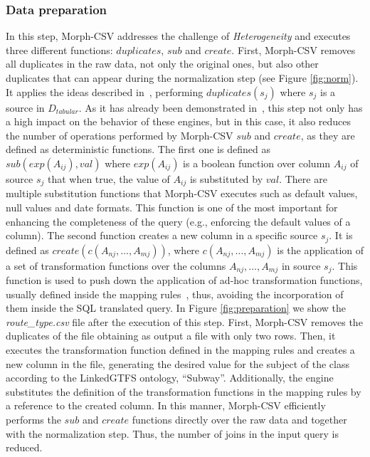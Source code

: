 \subsubsection*{Data preparation}
In this step, Morph-CSV addresses the challenge of \textit{Heterogeneity} and executes three different functions: $duplicates$, $sub$ and $create$. First, Morph-CSV removes all duplicates in the raw data, not only the original ones, but also other duplicates that can appear during the normalization step (see Figure \ref{fig:norm}). It applies the ideas described in~\citep{jozashoori2019mapsdi}, performing $duplicates(s_{j})$ where $s_{j}$ is a source in $D_{tabular}$. As it has already been demonstrated in~\citep{jozashoori2019mapsdi,iglesias2020sdm,jozashoori2020funmap}, this step not only has a high impact on the behavior of these engines, but in this case, it also reduces the number of operations performed by Morph-CSV $sub$ and $create$, as they are defined as deterministic functions. The first one is defined as $sub(exp(A_{ij}),val)$ where $exp(A_{ij})$ is a boolean function over column $A_{ij}$ of source $s_{j}$ that when true, the value of $A_{ij}$ is substituted by $val$. There are multiple substitution functions that Morph-CSV executes such as default values, null values and date formats. This function is one of the most important for enhancing the completeness of the query (e.g., enforcing the default values of a column). The second function creates a new column in a specific source $s_{j}$. It is defined as $create(c(A_{nj},\ldots,A_{mj}))$, where $c(A_{nj},\ldots,A_{mj})$ is the application of a set of transformation functions over the columns $A_{nj},\ldots,A_{mj}$ in source $s_{j}$. This function is used to push down the application of ad-hoc transformation functions, usually defined inside the mapping rules~\citep{junior2016funul,de2017declarative}, thus, avoiding the incorporation of them inside the SQL translated query. In Figure \ref{fig:preparation} we show the \textit{route\_type.csv} file after the execution of this step. First, Morph-CSV removes the duplicates of the file obtaining as output a file with only two rows. Then, it executes the transformation function defined in the mapping rules and creates a new column in the file, generating the desired value for the subject of the class according to the LinkedGTFS ontology, ``Subway''. Additionally, the engine substitutes the definition of the transformation functions in the mapping rules by a reference to the created column. In this manner, Morph-CSV efficiently performs the $sub$ and $create$ functions directly over the raw data and together with the normalization step. Thus, the number of joins in the input query is reduced.

